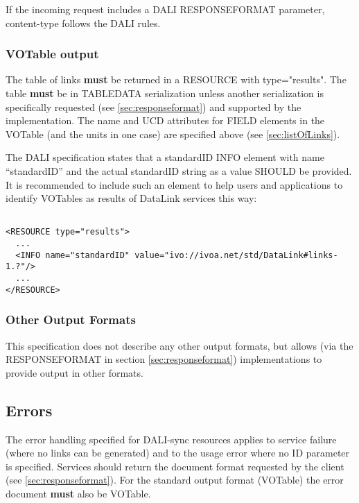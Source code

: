 \documentclass[11pt,a4paper]{ivoa}
\newcommand{\attval}[2]{#1={\allowbreak}{"}#2{"}}
\begin{document}
If the incoming request includes a DALI RESPONSEFORMAT parameter,
content-type follows the DALI rules.


\subsubsection{VOTable output}

The table of links {\bf must} be returned in a RESOURCE with
\attval{type}{results}. The table {\bf must} be in TABLEDATA serialization
unless another serialization is specifically requested
(see \ref{sec:responseformat})
and supported by the implementation.
The name and UCD attributes for FIELD elements in the VOTable
(and the units in one case) are specified above (see \ref{sec:listOfLinks}).

The DALI specification states that a standardID INFO element with
name ``standardID'' and the actual standardID string as a value SHOULD
be provided.  It is recommended to include such an element to help users
and applications to identify VOTables as results of DataLink services
this way:
\begin{verbatim}

<RESOURCE type="results">
  ... 
  <INFO name="standardID" value="ivo://ivoa.net/std/DataLink#links-1.?"/> 
  ... 
</RESOURCE>
\end{verbatim}


\subsubsection{Other Output Formats}

This specification does not describe any other output formats, but allows
(via the RESPONSEFORMAT in section \ref{sec:responseformat})
implementations to provide
output in other formats.


\subsection{Errors}

The error handling specified for DALI-sync resources applies
to service failure (where no links can be generated) and to the usage
error where no ID parameter is specified. Services should return the
document format requested by the client (see \ref{sec:responseformat}).
For the standard
output format (VOTable) the error document {\bf must} also be VOTable.
\end{document}
